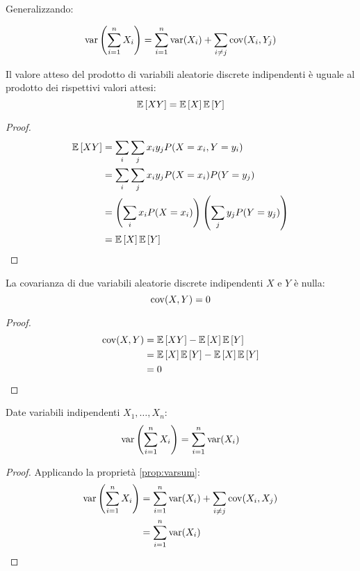 Generalizzando:
\begin{prop} \label{prop:varsumcov}
	\begin{equation*}
		\operatorname{var}\left(\sum_{i=1}^n X_i\right) = \sum_{i=1}^n \operatorname{var}(X_i) + \sum_{i\neq j}\operatorname{cov}(X_i,Y_j)
	\end{equation*}
\end{prop}
\noindent

\begin{teor}
	Il valore atteso del prodotto di variabili aleatorie discrete indipendenti è uguale al prodotto dei rispettivi valori attesi:
	\begin{equation*}
		\mathbb{E}\left[ XY \right] = \mathbb{E}\left[ X \right]\mathbb{E}\left[ Y \right]
	\end{equation*}
\end{teor}
\begin{proof}
	\begin{align*}
		\mathbb{E}\left[ XY \right] & = \sum_i\sum_j x_i y_j P(X=x_i,Y=y_i)                              \\
		        & = \sum_i\sum_j x_i y_j P(X=x_i)P(Y=y_j)                            \\
		        & = \left(\sum_i x_i P(X=x_i)\right)\left(\sum_j y_j P(Y=y_j)\right) \\
		        & = \mathbb{E}\left[ X \right]\mathbb{E}\left[ Y \right]
	\end{align*}
\end{proof}

\begin{corol}
	La covarianza di due variabili aleatorie discrete indipendenti $X$ e $Y$ è nulla:
	\begin{equation*}
		\operatorname{cov}(X,Y) = 0
	\end{equation*}
\end{corol}
\begin{proof}
	\begin{align*}
		\operatorname{cov}(X,Y) & = \mathbb{E}\left[ XY \right]-\mathbb{E}\left[ X \right]\mathbb{E}\left[ Y \right]      \\
		          & = \mathbb{E}\left[ X \right]\mathbb{E}\left[ Y \right]-\mathbb{E}\left[ X \right]\mathbb{E}\left[ Y \right] \\
		          & = 0
	\end{align*}
\end{proof}

\begin{corol}
	Date variabili indipendenti $X_1,\dots,X_n$:
	\begin{equation*}
		\operatorname{var}\left(\sum_{i=1}^n X_i\right) = \sum_{i=1}^n \operatorname{var}(X_i)
	\end{equation*}
\end{corol}
\begin{proof}
	Applicando la proprietà \ref{prop:varsum}:
	\begin{align*}
		\operatorname{var}\left(\sum_{i=1}^n X_i\right) & = \sum_{i=1}^n\operatorname{var}(X_i)+\sum_{i\neq j}\operatorname{cov}(X_i,X_j) \\
		                                  & = \sum_{i=1}^n \operatorname{var}(X_i)
	\end{align*}
\end{proof}


